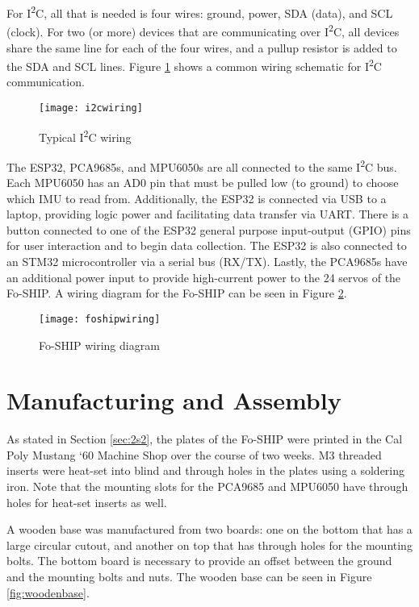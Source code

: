\documentclass[11pt]{ucthesisCP}
\begin{document}
For I\textsuperscript{2}C, all that is needed is four wires: ground, power, SDA (data), and SCL (clock). For two (or more) devices that are communicating over I\textsuperscript{2}C, all devices share the same line for each of the four wires, and a pullup resistor is added to the SDA and SCL lines. Figure \ref{fig:i2cwiring} shows a common wiring schematic for I\textsuperscript{2}C communication.

\begin{figure}[htbp]
	\centering
	\texttt{[image: i2cwiring]}
	\caption{Typical I\textsuperscript{2}C wiring \cite{tiI2C}}
	\label{fig:i2cwiring}
\end{figure}

The ESP32, PCA9685s, and MPU6050s are all connected to the same I\textsuperscript{2}C bus. Each MPU6050 has an AD0 pin that must be pulled low (to ground) to choose which IMU to read from. Additionally, the ESP32 is connected via USB to a laptop, providing logic power and facilitating data transfer via UART. There is a button connected to one of the ESP32 general purpose input-output (GPIO) pins for user interaction and to begin data collection. The ESP32 is also connected to an STM32 microcontroller via a serial bus (RX/TX). Lastly, the PCA9685s have an additional power input to provide high-current power to the 24 servos of the Fo-SHIP. A wiring diagram for the Fo-SHIP can be seen in Figure \ref{fig:foshipwiring}.

\begin{figure}[htbp]
	\centering
	\texttt{[image: foshipwiring]}
	\caption{Fo-SHIP wiring diagram}
	\label{fig:foshipwiring}
\end{figure}

\section{Manufacturing and Assembly} \label{sec:2s4}
As stated in Section \ref{sec:2s2}, the plates of the Fo-SHIP were printed in the Cal Poly Mustang ‘60 Machine Shop over the course of two weeks. M3 threaded inserts were heat-set into blind and through holes in the plates using a soldering iron. Note that the mounting slots for the PCA9685 and MPU6050 have through holes for heat-set inserts as well.

A wooden base was manufactured from two boards: one on the bottom that has a large circular cutout, and another on top that has through holes for the mounting bolts. The bottom board is necessary to provide an offset between the ground and the mounting bolts and nuts. The wooden base can be seen in Figure \ref{fig:woodenbase}.
\end{document}
